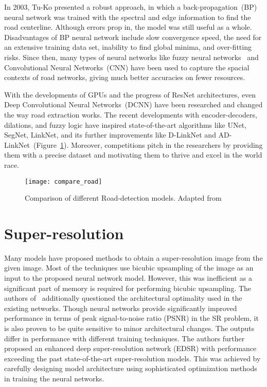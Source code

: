 In 2003, Tu-Ko presented a robust approach, in which a back-propagation~(BP) neural network was trained with the spectral and edge information to find the road centerline. Although errors prop in, the model was still useful as a whole. Disadvantages of BP neural network include slow convergence speed, the need for an extensive training data set, inability to find global minima, and over-fitting risks. Since then, many types of neural networks like fuzzy neural networks~\cite{mokhtarzade2008automatic} and Convolutional Neural Networks~(CNN) have been used to capture the spacial contexts of road networks, giving much better accuracies on fewer resources.

With the developments of GPUs and the progress of ResNet architectures, even Deep Convolutional Neural Networks~(DCNN) have been researched and changed the way road extraction works. The recent developments with encoder-decoders, dilations, and fuzzy logic have inspired state-of-the-art algorithms like UNet, SegNet, LinkNet, and its further improvements like D-LinkNet and AD-LinkNet~(Figure~\ref{fig:compare_road}). Moreover, competitions pitch in the researchers by providing them with a precise dataset and motivating them to thrive and excel in the world race.

\begin{figure}[h!]
  \centering
  \texttt{[image: compare\_road]}
  \caption[Comparison of different Road-detection models.]{Comparison of different Road-detection models. Adapted from~\cite{AD-LinkNet}}
  \label{fig:compare_road}
\end{figure}


\section{Super-resolution}
Many models have proposed methods to obtain a super-resolution image from the given image. Most of the techniques use bicubic upsampling of the image as an input to the proposed neural network model. However, this was inefficient as a significant part of memory is required for performing bicubic upsampling. The authors of~\cite{EDSR} additionally questioned the architectural optimality used in the existing networks. Though neural networks provide significantly improved performance in terms of peak signal-to-noise ratio (PSNR) in the SR problem, it is also proven to be quite sensitive to minor architectural changes. The outputs differ in performance with different training techniques. The authors further proposed an enhanced deep super-resolution network (EDSR) with performance exceeding the past state-of-the-art super-resolution models. This was achieved by carefully designing model architecture using sophisticated optimization methods in training the neural networks.

